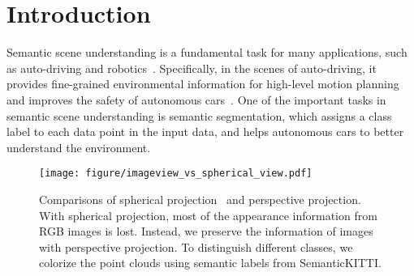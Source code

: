 \documentclass[10pt,twocolumn,letterpaper]{article}
\newcommand{\ice}[1]{{\color{black}#1}}
\begin{document}
\section{Introduction}

\ice{Semantic scene understanding is a fundamental task for many applications, such as auto-driving and robotics~\cite{gan2019self,Liu2019LPDNet3P,Rusu2008Towards3P,Shan2018LeGOLOAMLA}. Specifically, in the scenes of auto-driving, it provides fine-grained environmental information for high-level motion planning and improves the safety of autonomous cars~\cite{behley2019semantickitti,geiger2012we}.}
One of the important tasks in semantic scene understanding is semantic segmentation, which assigns a class label to each data point in the input data, and helps autonomous cars to better understand the environment.

\begin{figure}[t]
    \centering
    \texttt{[image: figure/imageview\_vs\_spherical\_view.pdf]}
    \caption{Comparisons of spherical projection~\cite{milioto2019rangenet++,wu2018squeezeseg} and perspective projection. With spherical projection, most of the appearance information from RGB images is lost. Instead, we preserve the information of images with perspective projection. To distinguish different classes, we colorize the point clouds using semantic labels from SemanticKITTI.}
    \label{fig:iv_vs_sv}
\end{figure}
\end{document}
